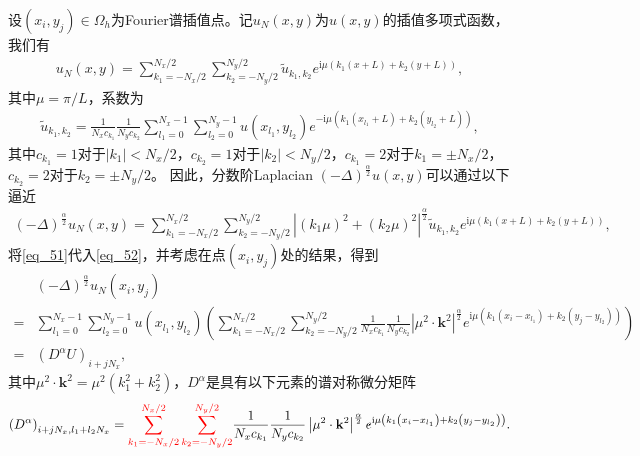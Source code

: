 设$\left(x_{i}, y_{j}\right) \in \Omega_{h}$为Fourier谱插值点。记$u_{N}(x, y)$为$u(x, y)$的插值多项式函数，我们有
\begin{align}\label{eq_50}
u_{N}(x, y)=\sum_{k_{1}=-N_{x} / 2}^{N_{x} / 2} \sum_{k_{2}=-N_{y} / 2}^{N_{y} / 2} \tilde{u}_{k_{1}, k_{2}} e^{\mathrm{i}\mu\left( k_{1} (x+L)+k_{2}(y+L)\right)},
\end{align}
其中$\mu={\pi}/{L}$，系数为
\begin{align}\label{eq_51}
\tilde{u}_{k_{1}, k_{2}}=\frac{1}{N_{x} c_{k_{1}}} \frac{1}{N_{y} c_{k_{2}}} \sum_{l_1=0}^{N_{x}-1} \sum_{l_2=0}^{N_{y}-1} u(x_{l_1}, y_{l_2}) e^{-\mathrm{i}\mu\left( k_{1}(x_{l_1}+L)+k_{2}(y_{l_2}+L)\right)},
\end{align}
其中$c_{k_{1}}=1$对于$\left|k_{1}\right|<N_{x} / 2$，$c_{k_{2}}=1$对于$\left|k_{2}\right|<N_{y} / 2$，$c_{k_{1}}=2$对于$k_{1}=\pm N_{x} / 2$，$c_{k_{2}}=2$对于$k_{2}=\pm N_{y} / 2$。
因此，分数阶Laplacian $(-\Delta)^{\frac{\alpha}{2}} u(x, y)$可以通过以下逼近
\begin{align}\label{eq_52}
(-\Delta)^{\frac{\alpha}{2}} u_{N}\left(x, y\right)=\sum\limits_{k_{1}=-N_{x} / 2}^{N_{x} / 2} \sum\limits_{k_{2}=-N_{y} / 2}^{N_{y} / 2}\left|\left(k_{1} \mu\right)^{2}+\left(k_{2} \mu\right)^{2}\right|^{\frac{\alpha}{2}} \tilde{u}_{k_{1}, k_{2}} e^{\mathrm{i}\mu\left( k_{1} (x+L)+k_{2}(y+L)\right)},
\end{align}
将\eqref{eq_51}代入\eqref{eq_52}，并考虑在点$(x_i,y_j)$处的结果，得到
\begin{align}
&(-\Delta)^{\frac{\alpha}{2}} u_{N}\left(x_{i}, y_{j}\right)\nonumber\\
=&\sum\limits_{l_{1}=0}^{N_{x}-1} \sum\limits_{l_{2}=0}^{N_{y}-1}u(x_{l_{1}}, y_{l_{2}})\left(\sum\limits_{k_{1}=-N_{x} / 2}^{N_{x} / 2} \sum\limits_{k_{2}=-N_{y} / 2}^{N_{y} / 2} \frac{1}{N_{x} c_{k_{1}}} \frac{1}{N_{y} c_{k_{2}}}\left|\mu^{2} \cdot \mathbf{k}^{2}\right|^{\frac{\alpha}{2}} e^{\mathrm{i} \mu\left(k_{1}\left(x_{i}-x_{l_{1}}\right)+k_{2}\left(y_{j}-y_{l_{2}}\right)\right)}\right)\nonumber\\
=&\left(D^{\alpha}U\right)_{i+j N_{x}},\label{eq_53}
\end{align}
其中$\mu^{2} \cdot \mathbf{k}^{2}=\mu^{2}\left(k_{1}^{2}+k_{2}^{2}\right)$，$D^{\alpha}$是具有以下元素的谱对称微分矩阵
\begin{align}\label{eq_54}
\left(D^{\alpha}\right)_{i+j N_{x}, l_{1}+l_{2} N_{x}}=\textcolor[rgb]{1.00,0.00,0.00}{\sum\limits_{k_{1}=-N_{x} / 2}^{N_{x} / 2} \sum\limits_{k_{2}=-N_{y} / 2}^{N_{y} / 2}}\frac{1}{N_{x} c_{k_{1}}} \frac{1}{N_{y} c_{k_{2}}}\left|\mu^{2} \cdot \mathbf{k}^{2}\right|^{\frac{\alpha}{2}} e^{\mathrm{i}\mu\left(k_{1}\left(x_{i}-x_{l_{1}}\right)+k_{2}\left(y_{j}-y_{l_{2}}\right)\right)}.
\end{align}

